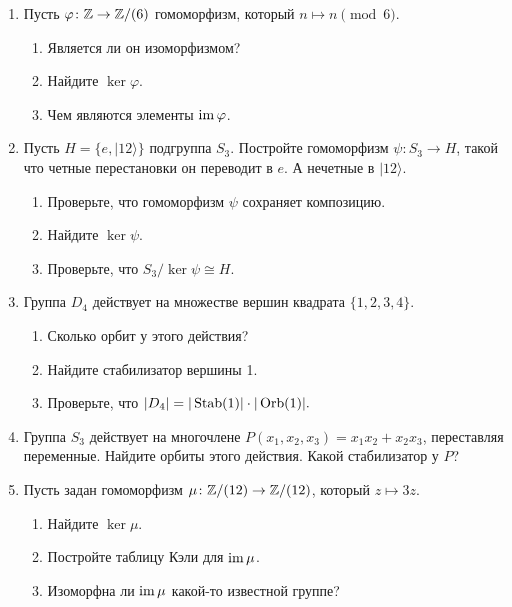 \begin{enumerate}
    \item Пусть $\varphi \colon \mathbb Z \to \mathbb Z/(6)$ гомоморфизм, который $n \mapsto n \pmod 6.$
        \begin{enumerate}
            \item Является ли он изоморфизмом?
            \item Найдите $\ker \varphi.$
            \item Чем являются элементы $\operatorname{im} \varphi$.
        \end{enumerate}
    \item Пусть $H = \{e, |1 2\rangle \}$ подгруппа $S_3$. Постройте гомоморфизм
         $\psi \colon S_3 \to H$, такой что четные перестановки он переводит в  $e.$
         А нечетные в $|1 2 \rangle$. 
         \begin{enumerate}
             \item Проверьте, что гомоморфизм $\psi$ сохраняет композицию.
             \item Найдите $\ker \psi$.
             \item Проверьте, что $S_3/\ker\psi \cong H$.
         \end{enumerate}
     \item Группа $D_4$ действует на множестве вершин квадрата $\{1, 2, 3, 4\}$.
         \begin{enumerate}
             \item Сколько орбит у этого действия?
             \item Найдите стабилизатор вершины 1.
             \item Проверьте, что \(
             |D_4| = |\operatorname{Stab}(1)| \cdot |\operatorname{Orb}(1)|
             .\)
         \end{enumerate}
     \item Группа $S_3$ действует на многочлене $P(x_1, x_2, x_3) = x_1x_2 + x_2x_3$,
         переставляя переменные. Найдите орбиты этого действия. Какой стабилизатор у $P$?
     \item Пусть задан гомоморфизм $\mu \colon \mathbb Z/(12) \to \mathbb Z/(12)$, который $z \mapsto 3z$.
         \begin{enumerate}
             \item Найдите $\ker \mu$.
             \item Постройте таблицу Кэли для $\operatorname{im} \mu$.
             \item Изоморфна ли $\operatorname{im} \mu$ какой-то известной группе?
         \end{enumerate}

\end{enumerate}
